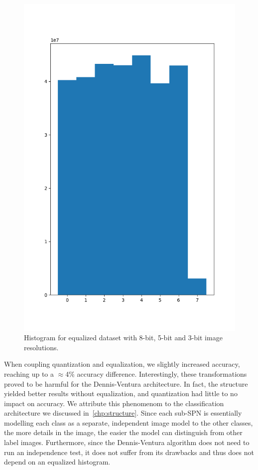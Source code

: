 \begin{figure}[h]
  \includegraphics[scale=0.3]{imgs/hist_3_eq.png}
  \caption{Histogram for equalized dataset with 8-bit, 5-bit and 3-bit image
  resolutions.\label{fig:hist-eq}}
\end{figure}

When coupling quantization and equalization, we slightly increased accuracy, reaching up to a
$\approx$4\% accuracy difference.  Interestingly, these transformations proved to be harmful for
the Dennis-Ventura architecture. In fact, the structure yielded better results without
equalization, and quantization had little to no impact on accuracy. We attribute this phenomenom to
the classification architecture we discussed in~\autoref{chp:structure}. Since each sub-SPN is
essentially modelling each class as a separate, independent image model to the other classes, the
more details in the image, the easier the model can distinguish from other label images.
Furthermore, since the Dennis-Ventura algorithm does not need to run an independence test, it does
not suffer from its drawbacks and thus does not depend on an equalized histogram.
